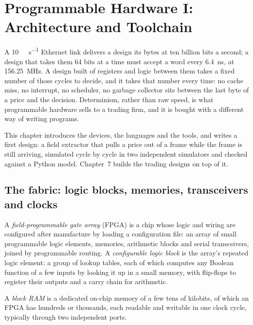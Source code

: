 \chapter{Programmable Hardware I: Architecture and Toolchain}\label{ch:nw:programmable-hardware-i-architecture-and-toolchain}

A \qty{10}{\giga\bit\per\second} Ethernet link delivers a design its bytes at ten billion bits a second; a design that takes them
64 bits at a time must accept a word every \qty{6.4}{\nano\second}, at 156.25~MHz. A design built of registers and logic between them
takes a fixed number of those cycles to decide, and it takes that number every time: no cache miss, no interrupt, no scheduler, no
garbage collector sits between the last byte of a price and the decision. Determinism, rather than raw speed, is what programmable
hardware sells to a trading firm, and it is bought with a different way of writing programs.

This chapter introduces the devices, the languages and the tools, and writes a first design: a field extractor that pulls a price out
of a frame while the frame is still arriving, simulated cycle by cycle in two independent simulators and checked against a Python
model. Chapter~7 builds the trading designs on top of it.

\section{The fabric: logic blocks, memories, transceivers and clocks}

\begin{definition}\label{def:nw:programmable-hardware-i-architecture-and-toolchain:clb}
A \emph{field-programmable gate array} (FPGA) is a chip whose logic and wiring are configured
after manufacture by loading a configuration file: an array of small programmable logic elements, memories, arithmetic blocks and
serial transceivers, joined by programmable routing. A \emph{configurable logic block} is the array's
repeated logic element: a group of lookup tables, each of which computes any Boolean function of a few inputs by looking it up in a
small memory, with flip-flops to register their outputs and a carry chain for arithmetic.
\end{definition}

\begin{definition}\label{def:nw:programmable-hardware-i-architecture-and-toolchain:bram}
A \emph{block RAM} is a dedicated on-chip memory of a few tens of kilobits, of which an FPGA has hundreds or
thousands, each readable and writable in one clock cycle, typically through two independent ports.
\end{definition}

